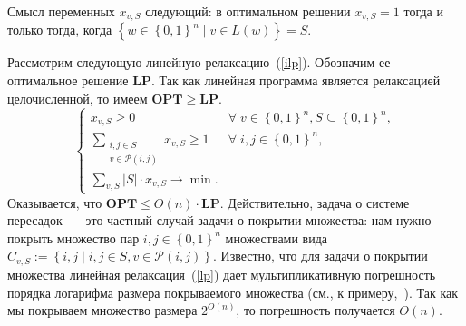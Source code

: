 \documentclass[12pt]{article}
\newcommand{\set}[1]{\left\{#1\right\}}
\newcommand{\abs}[1]{\left|#1\right|}
\newcommand{\zo}{\set{0, 1}}
\newcommand{\Pc}{\mathcal{P}}
\newcommand{\setst}[2]{\set{#1 \mid #2}}
\begin{document}
    Смысл переменных $x_{v,S}$ следующий: в оптимальном решении $x_{v,S} = 1$ тогда и только тогда, когда $\setst{w \in \zo^n}{v \in L(w)} = S$.

    Рассмотрим следующую линейную релаксацию~(\ref{ilp}). Обозначим ее оптимальное решение $\mathbf{LP}$.
    Так как линейная программа является релаксацией целочисленной, то имеем $\mathbf{OPT} \geq \mathbf{LP}$. 
    \begin{equation}
        \label{lp}
        \begin{cases}
            x_{v,S} \geq 0 & \forall \; v \in \zo^n, S \subseteq \zo^n, \\ 
            \sum_{\begin{smallmatrix}i, j \in S \\ v \in \Pc(i, j)\end{smallmatrix}} x_{v,S} \geq 1 & \forall \; i, j \in \zo^n, \\
            \sum_{v,S} \abs{S} \cdot x_{v,S} \to \min.
        \end{cases}
    \end{equation}
    Оказывается, что $\mathbf{OPT} \leq O(n) \cdot \mathbf{LP}$. Действительно, задача о системе пересадок~--- это частный случай
    задачи о покрытии множества: нам нужно покрыть множество пар $i, j \in \zo^n$ множествами вида
    $C_{v,S} := \setst{i, j}{i, j \in S, v \in \Pc(i, j)}$.
    Известно, что для задачи о покрытии множества линейная релаксация~(\ref{lp}) дает мультипликативную
    погрешность порядка логарифма размера покрываемого
    множества (см., к примеру,~\cite{V04}).
    Так как мы покрываем множество размера $2^{O(n)}$, то погрешность получается $O(n)$.
\end{document}
